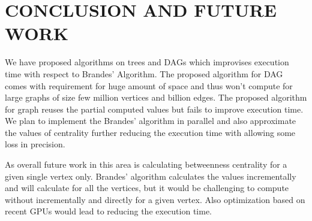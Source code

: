 \chapter{CONCLUSION AND FUTURE WORK}
\label{chap:concl}

We have proposed algorithms on trees and DAGs which improvises execution time with respect to Brandes' Algorithm. The proposed algorithm for DAG comes with requirement for huge amount of space and thus won't compute for large graphs of size few million vertices and billion edges. The proposed algorithm for graph reuses the partial computed values but fails to improve execution time. We plan to implement the Brandes' algorithm in parallel and also approximate the values of centrality further reducing the execution time with allowing some loss in precision.

As overall future work in this area is calculating betweenness centrality for a given single vertex only. Brandes' algorithm calculates the values incrementally and will calculate for all the vertices, but it would be challenging to compute without incrementally and directly for a given vertex. Also optimization based on recent GPUs would lead to reducing the execution time.